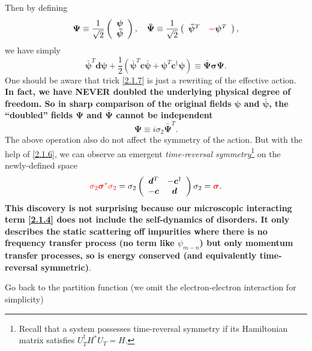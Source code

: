 \documentclass[10pt,nofootinbib,letterpaper]{revtex4}
\begin{document}
		Then by defining
		\begin{equation}\label{2.1.7}
			\bm{\Psi}\equiv\dfrac{1}{\sqrt{2}}\left(\begin{array}{c}
				\bm{\psi}\\\bm{\bar\psi}
			\end{array}\right),\quad \bm{\bar\Psi}\equiv\dfrac{1}{\sqrt{2}}\left(\begin{array}{cc}
				\bm{\bar\psi}^T & {\color{red}-}\bm{\psi}^T
			\end{array}\right), 
		\end{equation}
		we have simply
		\begin{equation*}
			\bm{\bar\psi}^T\bm{d}\bm{\psi}+\dfrac{1}{2}(\bm{\bar\psi}^T\bm{c}\bm{\bar\psi}+\bm{\psi}^T\bm{c}^\dagger\bm{\psi})\equiv\bm{\bar\Psi\sigma\Psi}.
		\end{equation*}
		One should be aware that trick \eqref{2.1.7} is just a rewriting of the effective action. {\color{red}\textbf{In fact, we have NEVER doubled the underlying physical degree of freedom. So in sharp comparison of the original fields $\bm{\psi}$ and $\bm{\bar\psi}$, the ``doubled'' fields $\bm{\Psi}$ and $\bm{\bar\Psi}$ cannot be independent}}
		\begin{equation}\label{2.1.7}
			\bm{\Psi}\equiv i\sigma_2\bm{\bar\Psi}^T.
		\end{equation}
		The above operation also do not affect the symmetry of the action. But with the help of \eqref{2.1.6}, we can observe an emergent \emph{time-reversal symmetry}\footnote{Recall that a system possesses time-reversal symmetry if its Hamiltonian matrix satisfies $U_T^\dagger H^*U_T=H$.} on the newly-defined space
		\begin{equation}\label{2.1.8}
			{\color{red}\sigma_2\bm{\sigma}^*\sigma_2}=\sigma_2 \left(\begin{array}{cc}
				\bm{d}^T & -\bm{c}^\dagger \\ -\bm{c} & \bm{d}
			\end{array}\right)\sigma_2={\color{red}\bm{\sigma}}.
		\end{equation}
		\textbf{This discovery is not surprising because our microscopic interacting term \eqref{2.1.4} does not include the self-dynamics of disorders. It only describes the static scattering off impurities where there is no frequency transfer process (no term like $\psi_{m-n}$) but only momentum transfer processes, so is energy conserved (and equivalently time-reversal symmetric)}.\par
		Go back to the partition function (we omit the electron-electron interaction for simplicity)
\end{document}
